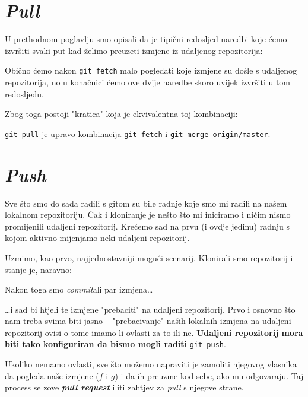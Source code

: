 

\section*{\emph{Pull}}

U prethodnom poglavlju smo opisali da je tipični redosljed naredbi koje ćemo izvršiti svaki put kad želimo preuzeti izmjene iz udaljenog repozitorija:


Obično ćemo nakon \verb+git fetch+ malo pogledati koje izmjene su došle s udaljenog repozitorija, no u konačnici ćemo ove dvije naredbe skoro uvijek izvršiti u tom redosljedu.

Zbog toga postoji "kratica" koja je ekvivalentna toj kombinaciji:


\verb+git pull+ je upravo kombinacija \verb+git fetch+ i \verb+git merge origin/master+.

\section*{\emph{Push}}

Sve što smo do sada radili s gitom su bile radnje koje smo mi radili na našem lokalnom repozitoriju.
Čak i kloniranje je nešto što mi iniciramo i ničim nismo promijenili udaljeni repozitorij.
Krećemo sad na prvu (i ovdje jedinu) radnju s kojom aktivno mijenjamo neki udaljeni repozitorij.

Uzmimo, kao prvo, najjednostavniji mogući scenarij.
Klonirali smo repozitorij i stanje je, naravno:



Nakon toga smo \emph{commit}ali par izmjena\dots



\dots{}i sad bi htjeli te izmjene "prebaciti" na udaljeni repozitorij.
Prvo i osnovno što nam treba svima biti jasno -- "prebacivanje" naših lokalnih izmjena na udaljeni repozitorij ovisi o tome imamo li ovlasti za to ili ne.
\textbf{Udaljeni repozitorij mora biti tako konfiguriran da bismo mogli raditi} \verb+git push+.

Ukoliko nemamo ovlasti, sve što možemo napraviti je zamoliti njegovog vlasnika da pogleda naše izmjene ($f$ i $g$) i da ih preuzme kod sebe, ako mu odgovaraju.
Taj process se zove \textbf{\emph{pull request}} iliti zahtjev za \emph{pull} s njegove strane.


